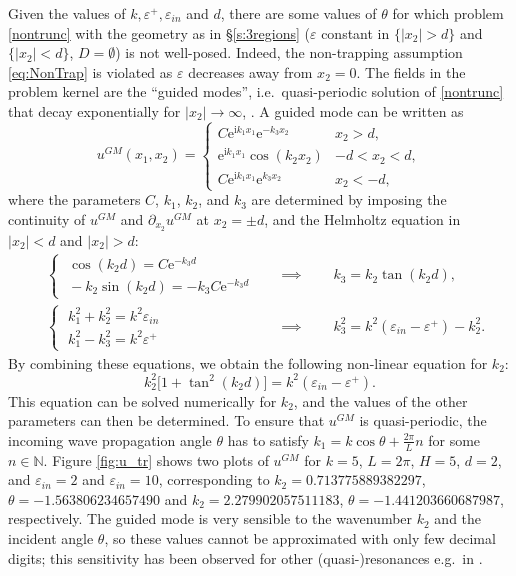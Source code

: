 \documentclass[a4paper,10pt]{article}
\newcommand{\IN}{{\mathbb N}}
\newcommand{\ri}{{\mathrm i}}
\newcommand{\re}{{\mathrm e}}
\begin{document}
Given the values of $k,\varepsilon^+,\varepsilon_{in}$ and $d$, there are some values of $\theta$ for which problem \eqref{nontrunc} with the geometry as in \S\ref{s:3regions} ($\varepsilon$ constant in $\{|x_2|>d\}$ and $\{|x_2|<d\}$, $D=\emptyset$) is not well-posed.
Indeed, the non-trapping assumption \eqref{eq:NonTrap} is violated as $\varepsilon$ decreases away from $x_2=0$.
The fields in the problem kernel are the ``guided modes'', i.e.\ quasi-periodic solution of \eqref{nontrunc} that decay exponentially for $|x_2|\to\infty$, \cite[\S4.1]{BonnetBD1994}.
A guided mode can be written as 
\begin{equation} \label{trapped}
u^{GM}(x_1,x_2) = \begin{cases} C\re^{\ri k_1 x_1} \re^{-k_3 x_2} & x_2 > d, \\ 
\re^{\ri k_1 x_1} \cos(k_2 x_2) & -d < x_2 < d, \\ 
C\re^{\ri k_1 x_1} \re^{k_3 x_2} & x_2 < -d, \end{cases}
\end{equation}
where the parameters $C$, $k_1$, $k_2$, and $k_3$ are determined by 
imposing the continuity of $u^{GM}$ and $\partial_{x_2}u^{GM}$ at $x_2=\pm d$, and the Helmholtz equation in $|x_2|<d$ and $|x_2|>d$:
\begin{align*}
&\begin{cases} \; \cos(k_2 d) = C \re^{-k_3 d} \\ \; -k_2 \sin (k_2 d) = -k_3 C\re^{-k_3 d}\end{cases}
&&\implies \qquad k_3 = k_2 \tan(k_2 d),
\\
&\begin{cases} \; k_1^2 + k_2^2 = k^2 \varepsilon_{in} \\ \; k_1^2 - k_3^2 = k^2 \varepsilon^+\end{cases}
&&\implies \qquad k_3^2 =k^2(\varepsilon_{in}-\varepsilon^+)-k_2^2.
\end{align*}
By combining these equations, we obtain the following non-linear equation for $k_2$:
\begin{equation*} %
k_2^2 \big[ 1 + \tan^2(k_2 d) \big] = k^2 ( \varepsilon_{in} - \varepsilon^+ ).
\end{equation*}
This equation can be solved numerically for $k_2$, and the values of the other parameters can then be determined.
To ensure that $u^{GM}$ is quasi-periodic, the incoming wave propagation angle $\theta$ has to satisfy $k_1 = k \cos \theta + \frac{2 \pi}{L} n$ for some $n\in\IN$. 
Figure \ref{fig:u_tr} shows two plots of $u^{GM}$ for $k = 5$, $L = 2\pi$, $H = 5$, $d = 2$, and 
$\varepsilon_{in} = 2$ and $\varepsilon_{in} = 10$, corresponding to 
$k_2=0.713775889382297$, $\theta=-1.563806234657490$ and $k_2=2.279902057511183$, $\theta=-1.441203660687987$, respectively. 
The guided mode is very sensible to the wavenumber $k_2$ and the incident angle $\theta$, so these values cannot be approximated with only few decimal digits; this sensitivity has been observed for other (quasi-)resonances e.g.\ in \cite[Figure~2]{MS17}.
\end{document}
